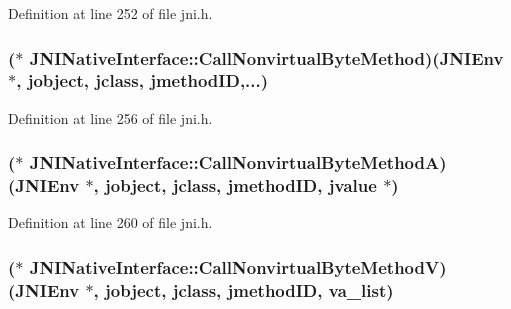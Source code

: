 Definition at line 252 of file jni.\-h.

\hypertarget{struct_j_n_i_native_interface_a271e0fc3d67e7ab6dd7ddcd7d14bcbf0}{
\subsubsection[{Call\-Nonvirtual\-Byte\-Method}]{($\ast$ J\-N\-I\-Native\-Interface\-::\-Call\-Nonvirtual\-Byte\-Method)({\bf J\-N\-I\-Env} $\ast$, {\bf jobject}, {\bf jclass}, {\bf jmethod\-I\-D},...)}}\label{struct_j_n_i_native_interface_a271e0fc3d67e7ab6dd7ddcd7d14bcbf0}


Definition at line 256 of file jni.\-h.

\hypertarget{struct_j_n_i_native_interface_a8bb10887a6c59c487a0ff77bacd80e85}{
\subsubsection[{Call\-Nonvirtual\-Byte\-Method\-A}]{($\ast$ J\-N\-I\-Native\-Interface\-::\-Call\-Nonvirtual\-Byte\-Method\-A)({\bf J\-N\-I\-Env} $\ast$, {\bf jobject}, {\bf jclass}, {\bf jmethod\-I\-D}, {\bf jvalue} $\ast$)}}\label{struct_j_n_i_native_interface_a8bb10887a6c59c487a0ff77bacd80e85}


Definition at line 260 of file jni.\-h.

\hypertarget{struct_j_n_i_native_interface_a64ec30f2c9f17cc43e4dd005224e8f2a}{
\subsubsection[{Call\-Nonvirtual\-Byte\-Method\-V}]{($\ast$ J\-N\-I\-Native\-Interface\-::\-Call\-Nonvirtual\-Byte\-Method\-V)({\bf J\-N\-I\-Env} $\ast$, {\bf jobject}, {\bf jclass}, {\bf jmethod\-I\-D}, va\-\_\-list)}}\label{struct_j_n_i_native_interface_a64ec30f2c9f17cc43e4dd005224e8f2a}


